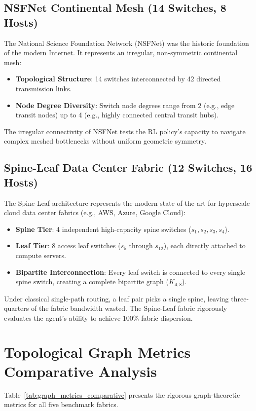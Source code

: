 \subsection{NSFNet Continental Mesh (14 Switches, 8 Hosts)}
The National Science Foundation Network (NSFNet) was the historic foundation of the modern Internet. It represents an irregular, non-symmetric continental mesh:
\begin{itemize}
    \item \textbf{Topological Structure}: 14 switches interconnected by 42 directed transmission links.
    \item \textbf{Node Degree Diversity}: Switch node degrees range from 2 (e.g., edge transit nodes) up to 4 (e.g., highly connected central transit hubs).
\end{itemize}
The irregular connectivity of NSFNet tests the RL policy's capacity to navigate complex meshed bottlenecks without uniform geometric symmetry.

\subsection{Spine-Leaf Data Center Fabric (12 Switches, 16 Hosts)}
The Spine-Leaf architecture represents the modern state-of-the-art for hyperscale cloud data center fabrics (e.g., AWS, Azure, Google Cloud):
\begin{itemize}
    \item \textbf{Spine Tier}: 4 independent high-capacity spine switches ($s_1, s_2, s_3, s_4$).
    \item \textbf{Leaf Tier}: 8 access leaf switches ($s_5$ through $s_{12}$), each directly attached to compute servers.
    \item \textbf{Bipartite Interconnection}: Every leaf switch is connected to every single spine switch, creating a complete bipartite graph ($K_{4, 8}$).
\end{itemize}
Under classical single-path routing, a leaf pair picks a single spine, leaving three-quarters of the fabric bandwidth wasted. The Spine-Leaf fabric rigorously evaluates the agent's ability to achieve 100\% fabric dispersion.

\section{Topological Graph Metrics Comparative Analysis}
Table~\ref{tab:graph_metrics_comparative} presents the rigorous graph-theoretic metrics for all five benchmark fabrics.

